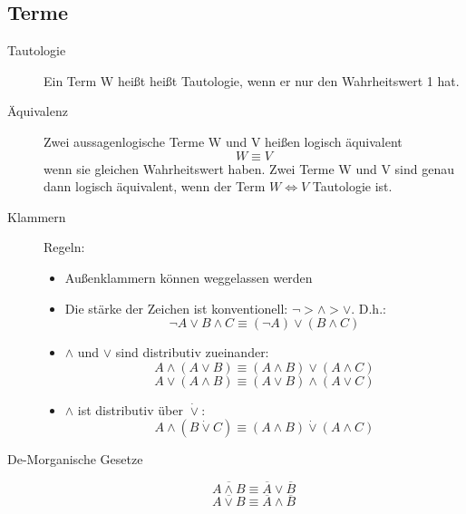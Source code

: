 \documentclass[12pt,a4paper]{article}
\begin{document}
\subsection{Terme}
	\begin{description}
		\item[Tautologie] Ein Term W heißt heißt Tautologie, wenn er nur den Wahrheitswert 1 hat.
		\item[Äquivalenz] Zwei aussagenlogische Terme W und V heißen logisch äquivalent $$W \equiv V$$ wenn sie gleichen Wahrheitswert haben. Zwei Terme W und V sind genau dann logisch äquivalent, wenn der Term $W\Leftrightarrow V$ Tautologie ist.
	\item[Klammern] Regeln:
			\begin{itemize}
				\item Außenklammern können weggelassen werden
				\item Die stärke der Zeichen ist konventionell: $\neg > \wedge > \vee$. D.h.:
					$$\neg A \vee B \wedge C \equiv (\neg A) \vee (B \wedge C)$$
				\item $\wedge$ und $\vee$ sind distributiv zueinander:
					$$A \wedge (A \vee B) \equiv (A \wedge B) \vee (A \wedge C)$$
					$$A \vee (A \wedge B) \equiv (A \vee B) \wedge (A \vee C)$$
				\item $\wedge$ ist distributiv über $\dot{\vee}$:
					$$A \wedge (B \dot{\vee} C) \equiv (A \wedge B) \dot{\vee} (A \wedge C)$$
			\end{itemize}
		\item[De-Morganische Gesetze] $$\overline{A \wedge B} \equiv \overline{A} \vee \overline{B}$$ $$\overline{A \vee B} \equiv \overline{A} \wedge \overline{B}$$
	\end{description}
\end{document}

